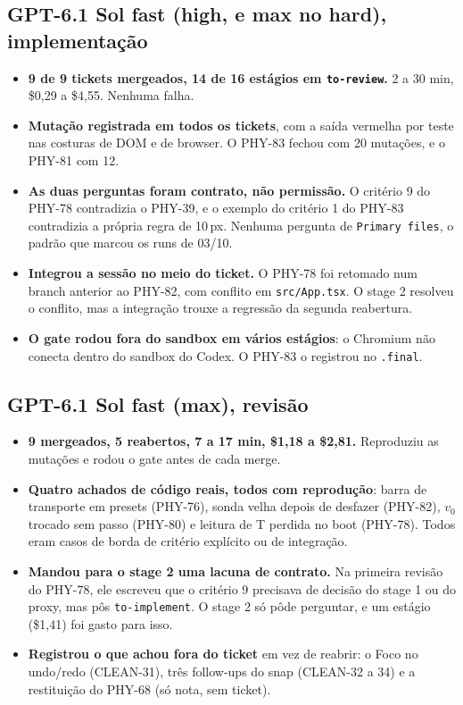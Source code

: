 \documentclass[11pt,a4paper]{article}
\begin{document}
\subsection*{GPT-6.1 Sol fast (high, e max no hard), implementação}
\begin{itemize}
  \item \textbf{9 de 9 tickets mergeados, 14 de 16 estágios em
        \texttt{to-review}.} 2 a 30 min, \$0,29 a \$4,55. Nenhuma falha.
  \item \textbf{Mutação registrada em todos os tickets}, com a saída vermelha
        por teste nas costuras de DOM e de browser. O PHY-83 fechou com 20
        mutações, e o PHY-81 com 12.
  \item \textbf{As duas perguntas foram contrato, não permissão.} O critério 9
        do PHY-78 contradizia o PHY-39, e o exemplo do critério 1 do PHY-83
        contradizia a própria regra de 10\,px. Nenhuma pergunta de
        \texttt{Primary files}, o padrão que marcou os runs de 03/10.
  \item \textbf{Integrou a sessão no meio do ticket.} O PHY-78 foi retomado
        num branch anterior ao PHY-82, com conflito em \texttt{src/App.tsx}. O
        stage 2 resolveu o conflito, mas a integração trouxe a regressão da
        segunda reabertura.
  \item \textbf{O gate rodou fora do sandbox em vários estágios}: o Chromium
        não conecta dentro do sandbox do Codex. O PHY-83 o registrou no
        \texttt{.final}.
\end{itemize}

\subsection*{GPT-6.1 Sol fast (max), revisão}
\begin{itemize}
  \item \textbf{9 mergeados, 5 reabertos, 7 a 17 min, \$1,18 a \$2,81.}
        Reproduziu as mutações e rodou o gate antes de cada merge.
  \item \textbf{Quatro achados de código reais, todos com reprodução}: barra de
        transporte em presets (PHY-76), sonda velha depois de desfazer (PHY-82),
        $v_0$ trocado sem passo (PHY-80) e leitura de T perdida no boot
        (PHY-78). Todos eram casos de borda de critério explícito ou de
        integração.
  \item \textbf{Mandou para o stage 2 uma lacuna de contrato.} Na primeira
        revisão do PHY-78, ele escreveu que o critério 9 precisava de decisão
        do stage 1 ou do proxy, mas pôs \texttt{to-implement}. O stage 2 só
        pôde perguntar, e um estágio (\$1,41) foi gasto para isso.
  \item \textbf{Registrou o que achou fora do ticket} em vez de reabrir: o
        Foco no undo/redo (CLEAN-31), três follow-ups do snap (CLEAN-32 a 34) e
        a restituição do PHY-68 (só nota, sem ticket).
\end{itemize}
\end{document}
